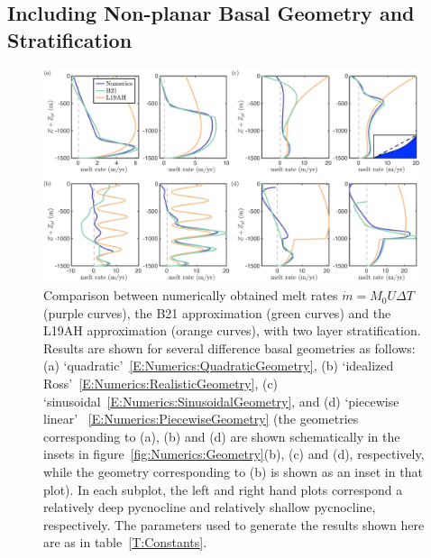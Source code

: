 \documentclass{jfm}
\begin{document}
\subsection{Including Non-planar Basal Geometry and Stratification}
\begin{figure}
\centering
\includegraphics[width = 0.99\textwidth]{figures/fig8_geometry_and_stratificationAveTScale.pdf}
\caption{Comparison between numerically obtained melt rates $\dot{m}= M_0 U \Delta T$ (purple curves), the B21 approximation (green curves) and the L19AH approximation (orange curves), with two layer stratification. Results are shown for several difference basal geometries as follows: (a) `quadratic'~\eqref{E:Numerics:QuadraticGeometry}, (b) `idealized Ross'~\eqref{E:Numerics:RealisticGeometry}, (c) `sinusoidal~\eqref{E:Numerics:SinusoidalGeometry}, and (d) `piecewise linear' ~\eqref{E:Numerics:PiecewiseGeometry} (the geometries corresponding to (a), (b) and (d) are shown schematically in the insets in figure~\ref{fig:Numerics:Geometry}(b), (c) and (d), respectively, while the geometry corresponding to (b) is shown as an inset in that plot). In each subplot, the left and right hand plots correspond a relatively deep pycnocline and relatively shallow pycnocline, respectively.  The parameters used to generate the results shown here are as in table~\ref{T:Constants}. }\label{fig:Numerics:pycnocline_and_geometry_idealized}
\end{figure}
\end{document}
